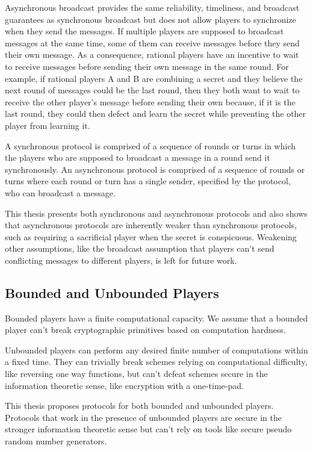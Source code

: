 \documentclass[12pt]{dalcsthesis}
\begin{document}
Asynchronous broadcast provides the same reliability, timeliness, and broadcast guarantees as synchronous broadcast but does not allow players to synchronize when they send the messages. If multiple players are supposed to broadcast messages at the same time, some of them can receive messages before they send their own message. As a consequence, rational players have an incentive to wait to receive messages before sending their own message in the same round. For example, if rational players A and B are combining a secret and they believe the next round of messages could be the last round, then they both want to wait to receive the other player's message before sending their own because, if it is the last round, they could then defect and learn the secret while preventing the other player from learning it.

A synchronous protocol is comprised of a sequence of rounds or turns in which the players who are supposed to broadcast a message in a round send it synchronously. An asynchronous protocol is comprised of a sequence of rounds or turns where each round or turn has a single sender, specified by the protocol, who can broadcast a message.

This thesis presents both synchronous and asynchronous protocols and also shows that asynchronous protocols are inherently weaker than synchronous protocols, such as requiring a sacrificial player when the secret is conspicuous. Weakening other assumptions, like the broadcast assumption that players can't send conflicting messages to different players, is left for future work.

\subsection{Bounded and Unbounded Players}

Bounded players have a finite computational capacity. We assume that a bounded player can't break cryptographic primitives based on computation hardness.

Unbounded players can perform any desired finite number of computations within a fixed time. They can trivially break schemes relying on computational difficulty, like reversing one way functions, but can't defeat schemes secure in the information theoretic sense, like encryption with a one-time-pad.

This thesis proposes protocols for both bounded and unbounded players. Protocols that work in the presence of unbounded players are secure in the stronger information theoretic sense but can't rely on tools like secure pseudo random number generators.
\end{document}
